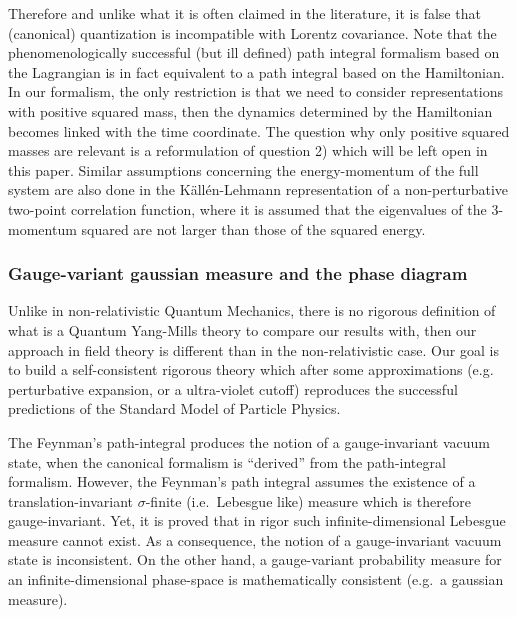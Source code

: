 \documentclass[11pt]{book}
\begin{document}
Therefore and unlike what it is often claimed in the literature, it is
false that (canonical) quantization is incompatible with Lorentz
covariance. Note that the phenomenologically successful (but ill
defined) path integral formalism based on the Lagrangian is in fact
equivalent to a path integral based on the
Hamiltonian\cite{Grosse1993Equivalence}. In our formalism, the only restriction is that we need
to consider representations with positive squared mass, then the
dynamics determined by the Hamiltonian becomes linked with the time
coordinate\cite{Dirac1949Forms}. The
question why only positive squared masses are relevant is a
reformulation of question 2) which will be left open in this paper.
Similar assumptions concerning the energy-momentum of the full system
are also done in the Källén-Lehmann representation of a non-perturbative
two-point correlation function, where it is assumed that the eigenvalues
of the 3-momentum squared are not larger than those of the squared
energy\cite{Itzykson1980Quantum}.

\hypertarget{gauge-variant-gaussian-measure-and-the-phase-diagram}{%
\subsubsection{Gauge-variant gaussian measure and the phase
diagram}\label{gauge-variant-gaussian-measure-and-the-phase-diagram}}

Unlike in non-relativistic Quantum Mechanics, there is no rigorous
definition of what is a Quantum Yang-Mills theory to compare our results
with, then our approach in field theory is different than in the
non-relativistic case. Our goal is to build a self-consistent rigorous
theory which after some approximations (e.g. perturbative expansion, or
a ultra-violet cutoff) reproduces the successful predictions of the
Standard Model of Particle Physics.

The Feynman's path-integral produces the notion of a gauge-invariant
vacuum state, when the canonical formalism is ``derived'' from the
path-integral formalism. However, the Feynman's path integral assumes
the existence of a translation-invariant \(\sigma\)-finite
(i.e.~Lebesgue like) measure which is therefore gauge-invariant. Yet, it
is proved that in rigor such infinite-dimensional Lebesgue measure
cannot exist. As a consequence, the notion of a gauge-invariant vacuum
state is inconsistent. On the other hand, a gauge-variant probability
measure for an infinite-dimensional phase-space is mathematically
consistent (e.g.~a gaussian measure).
\end{document}
